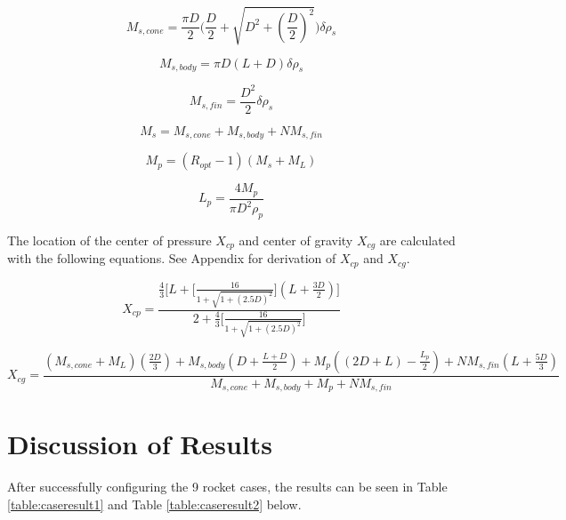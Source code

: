 \documentclass{report}
\begin{document}
\begin{equation}
    M_{s,cone} = \frac{\pi D}{2}\Biggl(\frac{D}{2}+\sqrt{D^2+(\frac{D}{2})^2}\Biggr)\delta\rho_s
\end{equation}

\begin{equation}
    M_{s,body} = \pi D(L+D)\delta\rho_s
\end{equation}

\begin{equation}
    M_{s,fin} = \frac{D^2}{2}\delta\rho_s
\end{equation}

\begin{equation}
    M_s = M_{s,cone} + M_{s,body} + NM_{s,fin}
\end{equation}

\begin{equation}
    M_p = (R_{opt}-1)(M_s+M_L)
\end{equation}

\begin{equation}
    L_p = \frac{4M_p}{\pi D^2 \rho_p}
\end{equation}

\noindent The location of the center of pressure $X_{cp}$ and center of gravity $X_{cg}$ are calculated with the following equations. 
See Appendix for derivation of $X_{cp}$ and $X_{cg}$.

\begin{equation}
    X_{cp} = \frac{\frac{4}{3}\Biggl[L+\biggl[\frac{16}{1+\sqrt{1+(2.5D)^2}}\biggr](L+\frac{3D}{2})\Biggr]}{2+\frac{4}{3}\biggl[\frac{16}{1+\sqrt{1+(2.5D)^2}}\biggr]}
\end{equation}

\begin{equation}
    X_{cg} = \frac{(M_{s,cone}+M_L)(\frac{2D}{3})+M_{s,body}(D+\frac{L+D}{2})+M_p((2D+L)-\frac{L_p}{2})+NM_{s,fin}(L+\frac{5D}{3})}{M_{s,cone}+M_{s,body}+M_p+NM_{s,fin}}
\end{equation}





\newpage
\section*{Discussion of Results}

After successfully configuring the 9 rocket cases, the results can be seen in Table \ref{table:caseresult1} and Table \ref{table:caseresult2} below.
\end{document}

